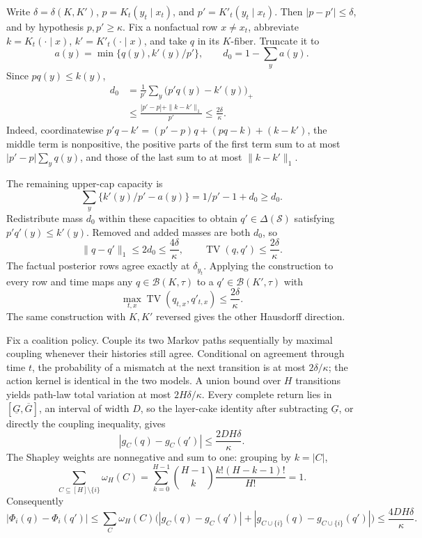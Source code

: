 Write \(\delta=\delta(K,K')\), \(p=K_t(y_t\mid x_t)\), and \(p'=K'_t(y_t\mid x_t)\).  Then \(|p-p'|\le\delta\), and by hypothesis \(p,p'\ge\kappa\).  Fix a nonfactual row \(x\ne x_t\), abbreviate \(k=K_t(\cdot\mid x)\), \(k'=K'_t(\cdot\mid x)\), and take \(q\) in its \(K\)-fiber.  Truncate it to
\[
 a(y)=\min\{q(y),k'(y)/p'\},
 \qquad d_0=1-\sum_ya(y).
\]
Since \(pq(y)\le k(y)\),
\[
\begin{aligned}
 d_0
 &=\frac1{p'}\sum_y\bigl(p'q(y)-k'(y)\bigr)_+\\
 &\le\frac{|p'-p|+\|k-k'\|_1}{p'}
 \le\frac{2\delta}{\kappa}.
\end{aligned}
\]
Indeed, coordinatewise \(p'q-k'=(p'-p)q+(pq-k)+(k-k')\), the middle term is nonpositive, the positive parts of the first term sum to at most \(|p'-p|\sum_yq(y)\), and those of the last sum to at most \(\|k-k'\|_1\).

The remaining upper-cap capacity is
\[
 \sum_y\{k'(y)/p'-a(y)\}=1/p'-1+d_0\ge d_0.
\]
Redistribute mass \(d_0\) within these capacities to obtain \(q'\in\Delta(\mathcal S)\) satisfying \(p'q'(y)\le k'(y)\).  Removed and added masses are both \(d_0\), so
\[
 \|q-q'\|_1\le2d_0\le\frac{4\delta}{\kappa},
 \qquad
 \operatorname{TV}(q,q')\le\frac{2\delta}{\kappa}.
\]
The factual posterior rows agree exactly at \(\delta_{y_t}\).  Applying the construction to every row and time maps any \(q\in\mathcal B(K,\tau)\) to a \(q'\in\mathcal B(K',\tau)\) with
\[
 \max_{t,x}\operatorname{TV}(q_{t,x},q'_{t,x})
 \le\frac{2\delta}{\kappa}.
\]
The same construction with \(K,K'\) reversed gives the other Hausdorff direction.

Fix a coalition policy.  Couple its two Markov paths sequentially by maximal coupling whenever their histories still agree.  Conditional on agreement through time \(t\), the probability of a mismatch at the next transition is at most \(2\delta/\kappa\); the action kernel is identical in the two models.  A union bound over \(H\) transitions yields path-law total variation at most \(2H\delta/\kappa\).  Every complete return lies in \([\underline G,\overline G]\), an interval of width \(D\), so the layer-cake identity after subtracting \(\underline G\), or directly the coupling inequality, gives
\[
 |g_C(q)-g_C(q')|\le\frac{2DH\delta}{\kappa}.
\]
The Shapley weights are nonnegative and sum to one: grouping by \(k=|C|\),
\[
 \sum_{C\subseteq[H]\setminus\{i\}}\omega_H(C)
 =\sum_{k=0}^{H-1}{H-1\choose k}\frac{k!(H-k-1)!}{H!}=1.
\]
Consequently
\[
 |\Phi_i(q)-\Phi_i(q')|
 \le\sum_C\omega_H(C)
   \bigl(|g_C(q)-g_C(q')|+|g_{C\cup\{i\}}(q)-g_{C\cup\{i\}}(q')|\bigr)
 \le\frac{4DH\delta}{\kappa}.
\]

